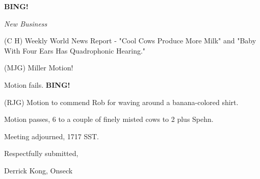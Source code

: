 \documentclass[12pt]{article}
\newcommand{\bing}{{\bf BING!} }
\newcommand{\goto}[1]{\bing \vskip 12pt \centerline{{\em{#1}}}}
\begin{document}
\goto{New Business}

(C H) Weekly World News Report - "Cool Cows Produce More Milk" and "Baby With Four Ears Has Quadrophonic Hearing."

(MJG) Miller Motion!

Motion fails. \bing

(RJG) Motion to commend Rob for waving around a banana-colored shirt.

Motion passes, 6 to a couple of finely misted cows to 2 plus Spehn.

\vspace{12pt}

\noindent
Meeting adjourned, 1717 SST.

\vspace{18pt}

\centerline{Respectfully submitted,}
\centerline{Derrick Kong, Onseck}
\end{document}
